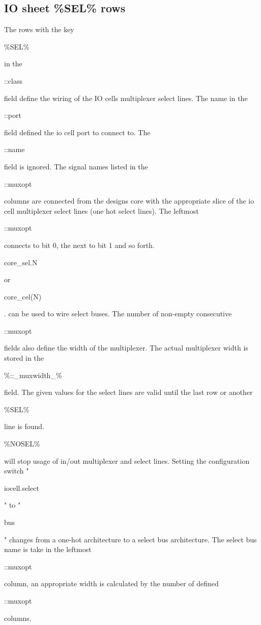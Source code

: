 \documentclass[a4paper,12pt]{article}
\begin{document}
\subsection{IO sheet \%SEL\% rows}
The rows with the key \begin{tt}\%SEL\%\end{tt} in the \begin{tt}::class\end{tt} field define the wiring of the IO cells multiplexer select lines. The  name in the \begin{tt}::port\end{tt} field defined the io cell port to connect to. The \begin{tt}::name\end{tt} field is ignored. The signal names listed in the \begin{tt}::muxopt\end{tt} columns are connected from the designs core with the appropriate slice of the io cell multiplexer select lines (one hot select lines). The leftmost \begin{tt}::muxopt\end{tt} connects to bit 0, the next to bit 1 and so forth. \begin{tt}core\_sel.N\end{tt} or \begin{tt}core\_cel(N)\end{tt}. can be used to wire select buses. The number of non-empty consecutive \begin{tt}::muxopt\end{tt} fields also define the width of the multiplexer. The actual multiplexer width is stored in the \begin{tt}\%::\_muxwidth\_\%\end{tt} field.\newline
The given values for the select lines are valid until the last row or another \begin{tt}\%SEL\%\end{tt} line is found.\newline
\begin{tt}\%NOSEL\%\end{tt} will stop usage of in/out multiplexer and select lines.\newline
Setting the configuration switch "\begin{tt}iocell.select\end{tt}" to "\begin{tt}bus\end{tt}" changes from a one-hot architecture to a select bus architecture. The select bus name is take in the leftmost \begin{tt}::muxopt\end{tt} column, an appropriate width is calculated by the number of defined \begin{tt}::muxopt\end{tt} columns.\newline
\end{document}
